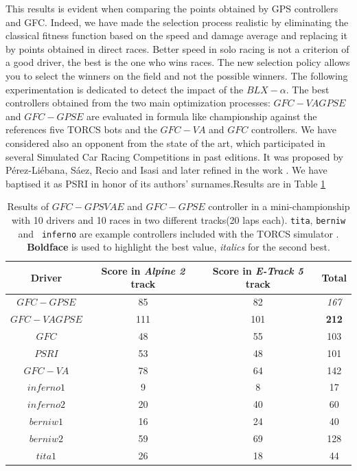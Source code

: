 \documentclass[10pt,journal,compsoc]{IEEEtran}
\begin{document}
This results is evident when comparing the points obtained by GPS controllers and GFC.
Indeed, we have made the selection process  realistic by eliminating
the classical fitness function based on the speed and damage average
and replacing it by points obtained in direct races. 
Better speed in solo racing is not a criterion of a good driver, the
best is the one who wins races. The new selection policy allows you to
select the winners on the field and not the possible winners. 
The following experimentation is dedicated to detect the impact of the $BLX-\alpha$.
The best controllers obtained from the two main optimization
processes: $GFC-VAGPSE$ and $GFC-GPSE$ are evaluated in formula like
championship against the references five TORCS bots and the $GFC-VA$
and $GFC$ controllers. We have considered also an opponent from the
state of the art, which participated in several Simulated Car Racing
Competitions in past editions.  %
It was proposed by P{\'e}rez-Li{\'e}bana, S{\'a}ez, Recio and Isasi \cite{EvolvingRuleSystem08} and later refined in the work \cite{PerezEvolvingFuzzy09}. We have baptised it as PSRI in honor of its authors' surnames.Results are in Table \ref{tab:allsresults}
%
\begin{table}[ht]
	\centering
	{\scriptsize
		\caption{ Results of $GFC-GPSVAE$ and $GFC-GPSE$
                  controller in a mini-championship with 10 drivers
                  and 10 %
			races in two different tracks(20 laps each). {\tt tita}, {\tt berniw} and {\tt
				inferno} are example controllers included with the TORCS
			simulator \cite{torcs4}.  {\bf Boldface} is
                        used to highlight the best value, {\em italics} for the second
                    best.}
		{
			\begin{tabular}{|c|c|c||c|}
				\hline
				Driver&Score in \textit{Alpine 2} track &Score in \textit{E-Track 5} track &Total\\
				\hline
				\hline
$GFC-GPSE$&	85&	82&	{\em 167}\\
$GFC-VAGPSE$&111&101&            {\bf 212}\\
$GFC$&		48&	55&	103\\
$PSRI$&		53&	48&	101\\
$GFC-VA$&	78&	64&	142\\
$inferno1$&	9&	8&	17\\
$inferno2$&	20&	40&	60\\
$berniw1$&	16&	24&	40\\
$berniw2$&	59&	69&	128\\
$tita1$&	26&	18&	44\\
					\hline
				
			\end{tabular}
		}\label{tab:allsresults}
	}
\end{table}
%
\end{document}
